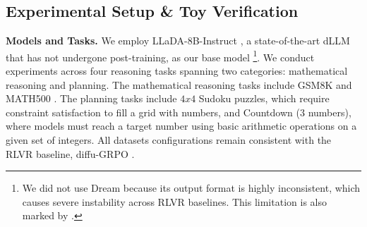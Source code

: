 \documentclass{llmxive}
\begin{document}
\subsection{Experimental Setup \& Toy Verification} \label{sec4.1}


\textbf{Models and Tasks.} We employ LLaDA-8B-Instruct \citep{nie2025large}, a state-of-the-art dLLM that has not undergone post-training, as our base model \footnote{We did not use Dream \citep{ye2025dream} because its output format is highly inconsistent, which causes severe
instability across RLVR baselines. This limitation is also marked by \citep{pan2025d}.}. We conduct experiments across four reasoning tasks spanning two categories: mathematical reasoning and planning. The mathematical reasoning tasks include GSM8K \citep{cobbe2021training} and MATH500 \citep{lightman2023let}. The planning tasks include $4x4$ Sudoku puzzles, which require
constraint satisfaction to fill a grid with numbers, and Countdown ($3$ numbers), where models must reach a target number using basic arithmetic operations on a given set of integers. All datasets configurations remain consistent with the RLVR baseline, diffu-GRPO \citep{zhao2025d1}. 
\end{document}
